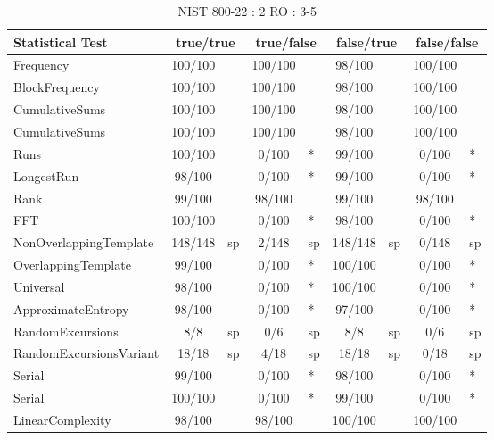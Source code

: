 \begin{table}[H]
\centering
\caption{NIST 800-22 : 2 RO : 3-5}
\label{tab:ch4_nist_22_2RO_8I}
\begin{tabular}{|l|c|l|c|l|c|l|c|l|}
\hline
\textbf{Statistical Test} & \multicolumn{2}{c|}{\textbf{true/true}} & \multicolumn{2}{c|}{\textbf{true/false}} & \multicolumn{2}{c|}{\textbf{false/true}} & \multicolumn{2}{c|}{\textbf{false/false}} \\ \hline
Frequency               & 100/100 &     & 100/100 &     &  98/100 &     & 100/100 &     \\ \hline
BlockFrequency          & 100/100 &     & 100/100 &     &  98/100 &     & 100/100 &     \\ \hline
CumulativeSums          & 100/100 &     & 100/100 &     &  98/100 &     & 100/100 &     \\ \hline
CumulativeSums          & 100/100 &     & 100/100 &     &  98/100 &     & 100/100 &     \\ \hline
Runs                    & 100/100 &     &   0/100 & *   &  99/100 &     &   0/100 & *   \\ \hline
LongestRun              &  98/100 &     &   0/100 & *   &  99/100 &     &   0/100 & *   \\ \hline
Rank                    &  99/100 &     &  98/100 &     &  99/100 &     &  98/100 &     \\ \hline
FFT                     & 100/100 &     &   0/100 & *   &  98/100 &     &   0/100 & *   \\ \hline
NonOverlappingTemplate  & 148/148 & sp  &   2/148 & sp  & 148/148 & sp  &   0/148 & sp  \\ \hline
OverlappingTemplate     &  99/100 &     &   0/100 & *   & 100/100 &     &   0/100 & *   \\ \hline
Universal               &  98/100 &     &   0/100 & *   & 100/100 &     &   0/100 & *   \\ \hline
ApproximateEntropy      &  98/100 &     &   0/100 & *   &  97/100 &     &   0/100 & *   \\ \hline
RandomExcursions        &     8/8 & sp  &     0/6 & sp  &     8/8 & sp  &     0/6 & sp  \\ \hline
RandomExcursionsVariant &   18/18 & sp  &    4/18 & sp  &   18/18 & sp  &    0/18 & sp  \\ \hline
Serial                  &  99/100 &     &   0/100 & *   &  98/100 &     &   0/100 & *   \\ \hline
Serial                  & 100/100 &     &   0/100 & *   &  99/100 &     &   0/100 & *   \\ \hline
LinearComplexity        &  98/100 &     &  98/100 &     & 100/100 &     & 100/100 &     \\ \hline
\end{tabular}
\end{table}


